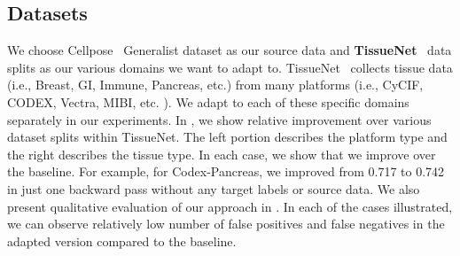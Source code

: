 \subsection{Datasets}
We choose Cellpose~\cite{stringer2021cellpose} Generalist dataset as our source data and \textbf{TissueNet}~\cite{TissueNet} data splits as our various domains we want to adapt to. TissueNet~\cite{TissueNet} collects tissue data (i.e., Breast, GI, Immune, Pancreas, etc.) from many platforms (i.e., CyCIF, CODEX, Vectra, MIBI, etc. ). We adapt to each of these specific domains separately in our experiments. In , we show relative improvement over various dataset splits within TissueNet. The left portion describes the platform type and the right describes the tissue type. In each case, we show that we improve over the baseline. For example, for Codex-Pancreas, we improved from 0.717 to 0.742 in just one backward pass without any target labels or source data. We also present qualitative evaluation of our approach in . In each of the cases illustrated, we can observe relatively low number of false positives and false negatives in the adapted version compared to the baseline.

\begin{table}
    
    \caption{Comparative analysis on various splits of TissueNet. We show improvement with test-time adaptation. }
    \label{tab:tn1}
\end{table}

